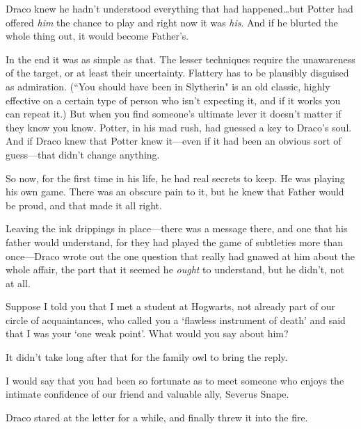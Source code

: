 Draco knew he hadn't understood everything that had happened…but Potter had offered \emph{him} the chance to play and right now it was \emph{his}. And if he blurted the whole thing out, it would become Father's.

In the end it was as simple as that. The lesser techniques require the unawareness of the target, or at least their uncertainty. Flattery has to be plausibly disguised as admiration. (``You should have been in Slytherin" is an old classic, highly effective on a certain type of person who isn't expecting it, and if it works you can repeat it.) But when you find someone's ultimate lever it doesn't matter if they know you know. Potter, in his mad rush, had guessed a key to Draco's soul. And if Draco knew that Potter knew it—even if it had been an obvious sort of guess—that didn't change anything.

So now, for the first time in his life, he had real secrets to keep. He was playing his own game. There was an obscure pain to it, but he knew that Father would be proud, and that made it all right.

Leaving the ink drippings in place—there was a message there, and one that his father would understand, for they had played the game of subtleties more than once—Draco wrote out the one question that really had gnawed at him about the whole affair, the part that it seemed he \emph{ought} to understand, but he didn't, not at all.

\begin{writtenNote}

Suppose I told you that I met a student at Hogwarts, not already part of our circle of acquaintances, who called you a `flawless instrument of death' and said that I was your `one weak point'. What would you say about him?

\end{writtenNote}

It didn't take long after that for the family owl to bring the reply.

\begin{writtenNote}

I would say that you had been so fortunate as to meet someone who enjoys the intimate confidence of our friend and valuable ally, Severus Snape.

\end{writtenNote}

Draco stared at the letter for a while, and finally threw it into the fire.

